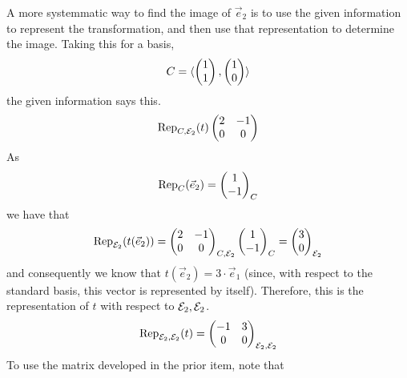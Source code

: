 \begin{exercises}
\begin{answer}
\begin{exparts}
          A more systemmatic way to find the image of $\vec{e}_2$ is to
          use the given information to represent the transformation, and then 
          use that representation to determine the image.  
          Taking this for a basis,
          \begin{equation*}
            C=\sequence{\colvec{1 \\ 1},\colvec{1 \\ 0}}
          \end{equation*}
          the given information says this.
          \begin{equation*}
            \rep{t}{C,\stdbasis_2}
            \begin{pmatrix}
              2  &-1  \\
              0  &0
            \end{pmatrix}
          \end{equation*}
          As
          \begin{equation*}
            \rep{\vec{e}_2}{C}=\colvec{1 \\ -1}_C
          \end{equation*}
          we have that
          \begin{equation*}
            \rep{t(\vec{e}_2)}{\stdbasis_2}
            =\begin{pmatrix}
               2  &-1  \\
               0  &0
             \end{pmatrix}_{C,\stdbasis_2}
            \colvec{1 \\ -1}_C
            =\colvec{3 \\ 0}_{\stdbasis_2}
          \end{equation*}
          and consequently we know that $t(\vec{e}_2)=3\cdot\vec{e}_1$
          (since, with respect to the standard basis, this vector is 
          represented by itself).
          Therefore, this is the representation of $t$ with respect to
          $\stdbasis_2,\stdbasis_2$.
          \begin{equation*}
            \rep{t}{\stdbasis_2,\stdbasis_2}
            =\begin{pmatrix}
               -1 &3   \\
               0  &0
             \end{pmatrix}_{\stdbasis_2,\stdbasis_2}
          \end{equation*}
        \partsitem To use the matrix developed in the prior item, note that
          \begin{equation*}

\end{equation*}
\end{exparts}
\end{answer}
\end{exercises}
